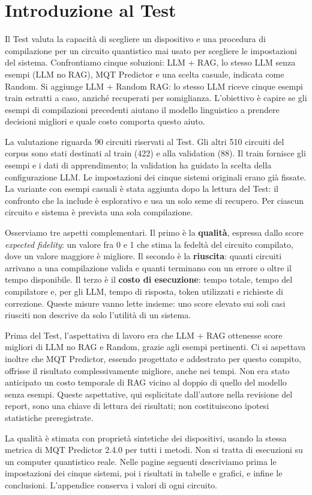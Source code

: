 \section{Introduzione al Test}
Il Test valuta la capacità di scegliere un dispositivo e una procedura di
compilazione per un circuito quantistico mai usato per scegliere le impostazioni
del sistema. Confrontiamo cinque soluzioni: LLM + RAG, lo stesso LLM senza
esempi (LLM no RAG), MQT Predictor e una scelta casuale, indicata come Random. Si aggiunge LLM + Random RAG: lo stesso LLM riceve
cinque esempi train estratti a caso, anziché recuperati per somiglianza.
L'obiettivo è capire se gli esempi di compilazioni precedenti aiutano il modello
linguistico a prendere decisioni migliori e quale costo comporta questo aiuto.

La valutazione riguarda 90 circuiti riservati al Test. Gli altri 510 circuiti
del corpus sono stati destinati al train (422) e alla validation (88).
Il train fornisce gli esempi e i dati di apprendimento; la validation ha guidato
la scelta della configurazione LLM. Le impostazioni dei cinque sistemi originali erano già fissate.
La variante con esempi casuali è stata aggiunta dopo la lettura del Test:
il confronto che la include è esplorativo e usa un solo seme di recupero.
Per ciascun circuito e sistema è prevista una sola compilazione.

Osserviamo tre aspetti complementari. Il primo è la \textbf{qualità}, espressa
dallo score \emph{expected fidelity}: un valore fra 0 e 1 che stima la fedeltà
del circuito compilato, dove un valore maggiore è migliore. Il secondo è la
\textbf{riuscita}: quanti circuiti arrivano a una compilazione valida e quanti
terminano con un errore o oltre il tempo disponibile. Il terzo è il
\textbf{costo di esecuzione}: tempo totale, tempo del compilatore e, per gli
LLM, tempo di risposta, token utilizzati e richieste di correzione.
Queste misure vanno lette insieme: uno score elevato sui soli casi riusciti
non descrive da solo l'utilità di un sistema.

Prima del Test, l'aspettativa di lavoro era che LLM + RAG ottenesse score
migliori di LLM no RAG e Random, grazie agli esempi pertinenti. Ci si aspettava
inoltre che MQT Predictor, essendo progettato e addestrato per questo compito,
offrisse il risultato complessivamente migliore, anche nei tempi.
Non era stato anticipato un costo temporale di RAG vicino al doppio di quello
del modello senza esempi. Queste aspettative, qui esplicitate dall'autore
nella revisione del report, sono una chiave di lettura dei risultati;
non costituiscono ipotesi statistiche preregistrate.

La qualità è stimata con proprietà sintetiche dei dispositivi, usando la stessa
metrica di MQT Predictor 2.4.0 per tutti i metodi. Non si tratta di esecuzioni
su un computer quantistico reale. Nelle pagine seguenti descriviamo prima
le impostazioni dei cinque sistemi, poi i risultati in tabelle e grafici,
e infine le conclusioni. L'appendice conserva i valori di ogni circuito.

